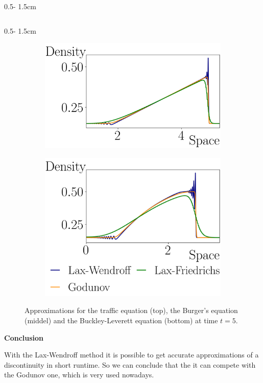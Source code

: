 \documentclass{uibposter}
\begin{document}
\begin{frame}[fragile]
\begin{columns}
\begin{column}{0.5\textwidth - 1.5cm}
\begin{column}{0.5\textwidth - 1.5cm}
\begin{figure}
	\begin{subfigure}{\textwidth}
		\includegraphics{fig/burger_compare.png}
	\end{subfigure}

	\begin{subfigure}{\textwidth}
		\includegraphics{fig/buckley_compare.png}
	\end{subfigure}
	\caption{Approximations for the traffic equation (top), the Burger's equation (middel) and the Buckley-Leverett equation (bottom) at time $t = 5$.}
	\label{img:non_lin_equation}
\end{figure}

\textbf{Conclusion}

\vspace{0.5cm}
With the Lax-Wendroff method it is possible to get accurate approximations of a discontinuity in short runtime. So we can conclude that the it can compete with the Godunov one, which is very used nowadays.


\end{column}
\end{column}
\end{columns}
\end{frame}
\end{document}

